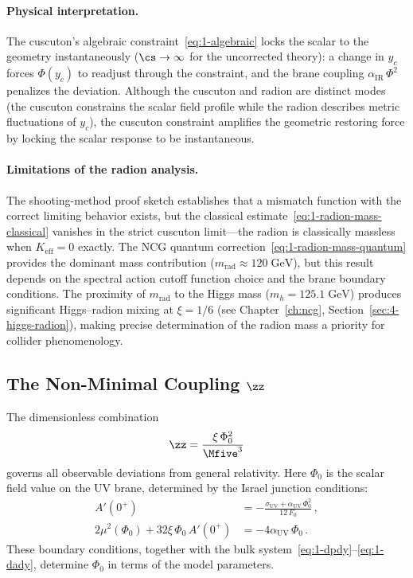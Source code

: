 \paragraph{Physical interpretation.} The cuscuton's algebraic constraint~\eqref{eq:1-algebraic} locks the scalar to the geometry instantaneously ($\cs \to \infty$ for the uncorrected theory): a change in $y_c$ forces $\Phi(y_c)$ to readjust through the constraint, and the brane coupling $\alpha_{\mathrm{IR}}\,\Phi^2$ penalizes the deviation. Although the cuscuton and radion are distinct modes (the cuscuton constrains the scalar field profile while the radion describes metric fluctuations of $y_c$), the cuscuton constraint amplifies the geometric restoring force by locking the scalar response to be instantaneous.

\paragraph{Limitations of the radion analysis.} The shooting-method proof sketch establishes that a mismatch function with the correct limiting behavior exists, but the classical estimate~\eqref{eq:1-radion-mass-classical} vanishes in the strict cuscuton limit---the radion is classically massless when $K_{\mathrm{eff}} = 0$ exactly. The NCG quantum correction~\eqref{eq:1-radion-mass-quantum} provides the dominant mass contribution ($m_{\mathrm{rad}} \approx 120\;\mathrm{GeV}$), but this result depends on the spectral action cutoff function choice and the brane boundary conditions. The proximity of $m_{\mathrm{rad}}$ to the Higgs mass ($m_h = 125.1\;\mathrm{GeV}$) produces significant Higgs--radion mixing at $\xi = 1/6$ (see Chapter~\ref{ch:ncg}, Section~\ref{sec:4-higgs-radion}), making precise determination of the radion mass a priority for collider phenomenology.

\subsection{The Non-Minimal Coupling \texorpdfstring{$\zz$}{zeta\_0}}
\label{sec:1-zeta}

The dimensionless combination
\begin{equation}
\label{eq:1-zeta}
\zz = \frac{\xi\,\Phi_0^2}{\Mfive^3}
\end{equation}
governs all observable deviations from general relativity. Here $\Phi_0$ is the scalar field value on the UV brane, determined by the Israel junction conditions:
\begin{subequations}
\label{eq:1-junction}
\begin{align}
A'(0^+) &= -\frac{\sigma_{\mathrm{UV}} + \alpha_{\mathrm{UV}}\,\Phi_0^2}{12\, F_0}\,, \label{eq:1-junction-a}\\
2\mu^2(\Phi_0) + 32\xi\,\Phi_0\, A'(0^+) &= -4\alpha_{\mathrm{UV}}\,\Phi_0\,. \label{eq:1-junction-b}
\end{align}
\end{subequations}
These boundary conditions, together with the bulk system~\eqref{eq:1-dpdy}--\eqref{eq:1-dady}, determine $\Phi_0$ in terms of the model parameters.


